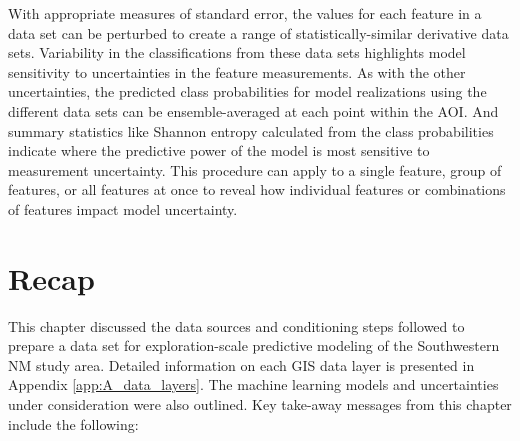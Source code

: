 With appropriate measures of standard error, the values for each feature in a data set can be perturbed to create a range of statistically-similar derivative data sets. Variability in the classifications from these data sets highlights model sensitivity to uncertainties in the feature measurements. As with the other uncertainties, the predicted class probabilities for model realizations using the different data sets can be ensemble-averaged at each point within the AOI. And summary statistics like Shannon entropy calculated from the class probabilities indicate where the predictive power of the model is most sensitive to measurement uncertainty. This procedure can apply to a single feature, group of features, or all features at once to reveal how individual features or combinations of features impact model uncertainty.
\vfill
\section{Recap}\label{ch3:recap}
This chapter discussed the data sources and conditioning steps followed to prepare a data set for exploration-scale predictive modeling of the Southwestern NM study area. Detailed information on each GIS data layer is presented in Appendix \ref{app:A_data_layers}. The machine learning models and uncertainties under consideration were also outlined. Key take-away messages from this chapter include the following:

